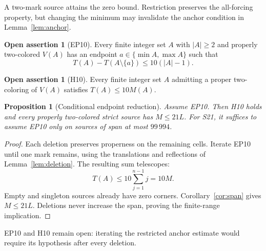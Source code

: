 \documentclass[11pt,a4paper]{article}
\newtheorem{proposition}[theorem]{Proposition}
\theoremstyle{definition}
\newtheorem{assertion}[theorem]{Open assertion}
\numberwithin{equation}{section}
\begin{document}
A two-mark source attains the zero bound. Restriction preserves the all-forcing property, but changing the minimum may invalidate the anchor condition in Lemma~\ref{lem:anchor}.

\begin{assertion}[EP10]\label{open:ep}
Every finite integer set $A$ with $|A|\ge2$ and properly two-colored $V(A)$ has an endpoint $a\in\{\min A,\max A\}$ such that
\begin{equation}\label{eq:ep10}
T(A)-T(A\setminus\{a\})\le10(|A|-1).
\end{equation}
\end{assertion}
\begin{assertion}[H10]\label{open:h}
Every finite integer set $A$ admitting a proper two-coloring of $V(A)$ satisfies $T(A)\le10M(A)$.
\end{assertion}

\begin{proposition}[Conditional endpoint reduction]\label{prop:peel}
Assume EP10. Then H10 holds and every properly two-colored strict source has $M\le21L$. For S21, it suffices to assume EP10 only on sources of span at most $99\,994$.
\end{proposition}
\begin{proof}
Each deletion preserves properness on the remaining cells. Iterate EP10 until one mark remains, using the translations and reflections of Lemma~\ref{lem:deletion}. The resulting sum telescopes:
\[
T(A)\le10\sum_{j=1}^{n-1}j=10M.
\]
Empty and singleton sources already have zero corners. Corollary~\ref{cor:span} gives $M\le21L$. Deletions never increase the span, proving the finite-range implication.
\end{proof}
EP10 and H10 remain open: iterating the restricted anchor estimate would require its hypothesis after every deletion.

\clearpage
{}
\begingroup\small


\endgroup
\end{document}
